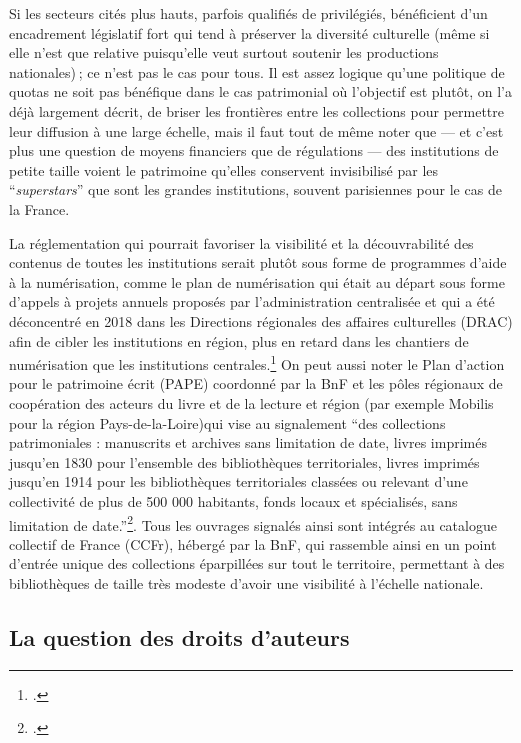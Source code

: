 Si les secteurs cités plus hauts, parfois qualifiés de privilégiés, bénéficient d’un encadrement législatif fort qui tend à préserver la diversité culturelle (même si elle n’est que relative puisqu’elle veut surtout soutenir les productions nationales) ; ce n’est pas le cas pour tous. Il est assez logique qu'une politique de quotas ne soit pas bénéfique dans le cas patrimonial où l’objectif est plutôt, on l’a déjà largement décrit, de briser les frontières entre les collections pour permettre leur diffusion à une large échelle, mais il faut tout de même noter que — et c’est plus une question de moyens financiers que de régulations — des institutions de petite taille voient le patrimoine qu’elles conservent invisibilisé par les \enquote{\textit{superstars}} que sont les grandes institutions, souvent parisiennes pour le cas de la France. 

La réglementation qui pourrait favoriser la visibilité et la découvrabilité des contenus de toutes les institutions serait plutôt sous forme de programmes d'aide à la numérisation, comme le plan de numérisation qui était au départ sous forme d'appels à projets annuels proposés par l'administration centralisée et qui a été déconcentré en 2018 dans les Directions régionales des affaires culturelles (DRAC) afin de cibler les institutions en région, plus en retard dans les chantiers de numérisation que les institutions centrales.\footcite{zotero-686} On peut aussi noter le Plan d'action pour le patrimoine écrit (PAPE) coordonné par la BnF et les pôles régionaux de coopération des acteurs du livre et de la lecture et région (par exemple Mobilis pour la région Pays-de-la-Loire)qui vise au signalement \enquote{des collections patrimoniales : manuscrits et archives sans limitation de date, livres imprimés jusqu’en 1830 pour l’ensemble des bibliothèques territoriales, livres imprimés jusqu’en 1914 pour les bibliothèques territoriales classées ou relevant d’une collectivité de plus de 500 000 habitants, fonds locaux et spécialisés, sans limitation de date.}\footcite{zotero-688}. Tous les ouvrages signalés ainsi sont intégrés au catalogue collectif de France (CCFr), hébergé par la BnF, qui rassemble ainsi en un point d'entrée unique des collections éparpillées sur tout le territoire, permettant à des bibliothèques de taille très modeste d'avoir une visibilité à l'échelle nationale. 

\subsection{La question des droits d'auteurs}

